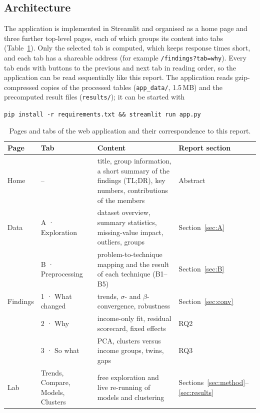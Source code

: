 \documentclass[11pt,a4paper]{article}
\begin{document}
\subsection{Architecture}
The application is implemented in Streamlit and organised as a home page and three further top-level pages, each of which groups its content into tabs (Table~\ref{tab:apppages}). Only the selected tab is computed, which keeps response times short, and each tab has a shareable address (for example \texttt{/findings?tab=why}). Every tab ends with buttons to the previous and next tab in reading order, so the application can be read sequentially like this report. The application reads gzip-compressed copies of the processed tables (\texttt{app\_data/}, 1.5\,MB) and the precomputed result files (\texttt{results/}); it can be started with

\begin{center}\texttt{pip install -r requirements.txt \&\& streamlit run app.py}\end{center}

\begin{table}[htbp]\centering\small
\caption{Pages and tabs of the web application and their correspondence to this report.}\label{tab:apppages}
\begin{tabular}{p{2.0cm}p{3.6cm}p{6.4cm}p{2.4cm}}
\toprule
Page & Tab & Content & Report section \\
\midrule
Home & -- & title, group information, a short summary of the findings (TL;DR), key numbers, contributions of the members & Abstract \\
Data & A · Exploration & dataset overview, summary statistics, missing-value impact, outliers, groups & Section~\ref{sec:A} \\
 & B · Preprocessing & problem-to-technique mapping and the result of each technique (B1--B5) & Section~\ref{sec:B} \\
Findings & 1 · What changed & trends, $\sigma$- and $\beta$-convergence, robustness & Section~\ref{sec:conv} \\
 & 2 · Why & income-only fit, residual scorecard, fixed effects & RQ2 \\
 & 3 · So what & PCA, clusters versus income groups, twins, gaps & RQ3 \\
Lab & Trends, Compare, Models, Clusters & free exploration and live re-running of models and clustering & Sections~\ref{sec:method}--\ref{sec:results} \\
\bottomrule
\end{tabular}
\end{table}
\end{document}
